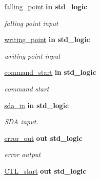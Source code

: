 \begin{DoxyCompactItemize}
\hyperlink{classstart__generator_ae13d7074835244efb7bd3538f42162b9}{falling\+\_\+point}  {\bfseries {\bfseries \textcolor{vhdlchar}{in}\textcolor{vhdlchar}{ }}} {\bfseries \textcolor{vhdlchar}{std\+\_\+logic}\textcolor{vhdlchar}{ }} 
\begin{DoxyCompactList}\small\item\em falling point input \end{DoxyCompactList}\item 
\hyperlink{classstart__generator_a12d6c9c482b5975efc30e34bb0951659}{writing\+\_\+point}  {\bfseries {\bfseries \textcolor{vhdlchar}{in}\textcolor{vhdlchar}{ }}} {\bfseries \textcolor{vhdlchar}{std\+\_\+logic}\textcolor{vhdlchar}{ }} 
\begin{DoxyCompactList}\small\item\em writing point input \end{DoxyCompactList}\item 
\hyperlink{classstart__generator_a3ddd3296c7691847b2d279c5ae6a20d9}{command\+\_\+start}  {\bfseries {\bfseries \textcolor{vhdlchar}{in}\textcolor{vhdlchar}{ }}} {\bfseries \textcolor{vhdlchar}{std\+\_\+logic}\textcolor{vhdlchar}{ }} 
\begin{DoxyCompactList}\small\item\em command start \end{DoxyCompactList}\item 
\hyperlink{classstart__generator_abee794776f0ccd767e459566850c3656}{sda\+\_\+in}  {\bfseries {\bfseries \textcolor{vhdlchar}{in}\textcolor{vhdlchar}{ }}} {\bfseries \textcolor{vhdlchar}{std\+\_\+logic}\textcolor{vhdlchar}{ }} 
\begin{DoxyCompactList}\small\item\em S\+DA input. \end{DoxyCompactList}\item 
\hyperlink{classstart__generator_a7d3323a10c64f9e722f7b8e5e5a7ad6a}{error\+\_\+out}  {\bfseries {\bfseries \textcolor{vhdlchar}{out}\textcolor{vhdlchar}{ }}} {\bfseries \textcolor{vhdlchar}{std\+\_\+logic}\textcolor{vhdlchar}{ }} 
\begin{DoxyCompactList}\small\item\em error output \end{DoxyCompactList}\item 
\hyperlink{classstart__generator_a4f40a2128a766139d2e04014b21be42e}{C\+T\+L\+\_\+start}  {\bfseries {\bfseries \textcolor{vhdlchar}{out}\textcolor{vhdlchar}{ }}} {\bfseries \textcolor{vhdlchar}{std\+\_\+logic}\textcolor{vhdlchar}{ }} 

\end{DoxyCompactItemize}
